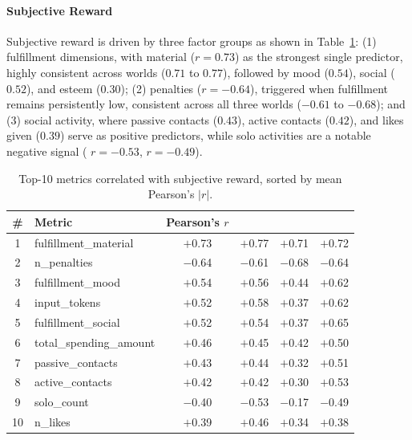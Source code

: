 \paragraph{Subjective Reward}
Subjective reward is driven by three factor groups as shown in Table~\ref{tab:corr_subjective}:
(1) fulfillment dimensions, with material ($r = 0.73$) as the strongest single predictor,
highly consistent across worlds ($0.71$ to $0.77$),
followed by mood ($0.54$), social ($0.52$), and esteem ($0.30$);
(2) penalties ($r = -0.64$), triggered when fulfillment remains persistently low,
consistent across all three worlds ($-0.61$ to $-0.68$);
and (3) social activity, where passive contacts ($0.43$), active contacts ($0.42$),
and likes given ($0.39$) serve as positive predictors,
while solo activities are a notable negative signal
(\apartment{} $r = -0.53$, \campus{} $r = -0.49$).

\begin{table}[htbp]
  \centering
  \caption{%
    Top-10 metrics correlated with subjective reward, sorted by mean Pearson's $|r|$.
  }
  \label{tab:corr_subjective}
  \small
  \begin{tabular}{clcccc}
    \toprule
    \# & Metric & Pearson's $r$ & \apartment{} & \academy{} & \campus{} \\
    \midrule
    1  & fulfillment\_material    & $+$0.73 & $+$0.77 & $+$0.71 & $+$0.72 \\
    2  & n\_penalties             & $-$0.64 & $-$0.61 & $-$0.68 & $-$0.64 \\
    3  & fulfillment\_mood        & $+$0.54 & $+$0.56 & $+$0.44 & $+$0.62 \\
    4  & input\_tokens            & $+$0.52 & $+$0.58 & $+$0.37 & $+$0.62 \\
    5  & fulfillment\_social      & $+$0.52 & $+$0.54 & $+$0.37 & $+$0.65 \\
    6  & total\_spending\_amount  & $+$0.46 & $+$0.45 & $+$0.42 & $+$0.50 \\
    7  & passive\_contacts        & $+$0.43 & $+$0.44 & $+$0.32 & $+$0.51 \\
    8  & active\_contacts         & $+$0.42 & $+$0.42 & $+$0.30 & $+$0.53 \\
    9  & solo\_count              & $-$0.40 & $-$0.53 & $-$0.17 & $-$0.49 \\
    10 & n\_likes                 & $+$0.39 & $+$0.46 & $+$0.34 & $+$0.38 \\
    \bottomrule
  \end{tabular}
\end{table}

